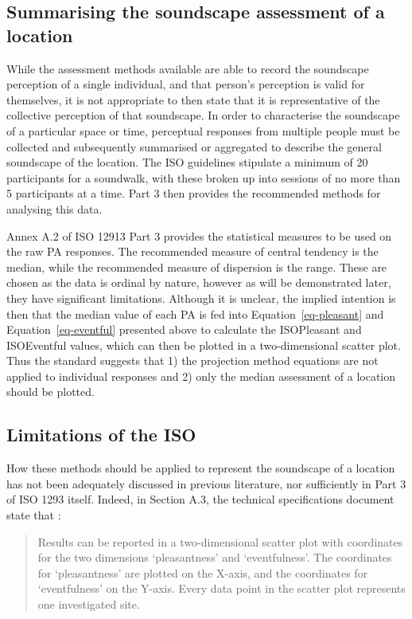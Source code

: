 \documentclass[
  authoryear,
  preprint,
  3p]{elsarticle}
\begin{document}
\subsection{Summarising the soundscape assessment of a
location}\label{summarising-the-soundscape-assessment-of-a-location}

While the assessment methods available are able to record the soundscape
perception of a single individual, and that person's perception is valid
for themselves, it is not appropriate to then state that it is
representative of the collective perception of that soundscape. In order
to characterise the soundscape of a particular space or time, perceptual
responses from multiple people must be collected and subsequently
summarised or aggregated to describe the general soundscape of the
location. The ISO guidelines stipulate a minimum of 20 participants for
a soundwalk, with these broken up into sessions of no more than 5
participants at a time. Part 3 then provides the recommended methods for
analysing this data.

Annex A.2 of ISO 12913 Part 3 provides the statistical measures to be
used on the raw PA responses. The recommended measure of central
tendency is the median, while the recommended measure of dispersion is
the range. These are chosen as the data is ordinal by nature, however as
will be demonstrated later, they have significant limitations. Although
it is unclear, the implied intention is then that the median value of
each PA is fed into Equation~\ref{eq-pleasant} and
Equation~\ref{eq-eventful} presented above to calculate the ISOPleasant
and ISOEventful values, which can then be plotted in a two-dimensional
scatter plot. Thus the standard suggests that 1) the projection method
equations are not applied to individual responses and 2) only the median
assessment of a location should be plotted.

\subsection{Limitations of the ISO}\label{limitations-of-the-iso}

How these methods should be applied to represent the soundscape of a
location has not been adequately discussed in previous literature, nor
sufficiently in Part 3 of ISO 1293 itself. Indeed, in Section A.3, the
technical specifications document state that \citep[5]{ISO12913_3}:

\begin{quote}
Results can be reported in a two-dimensional scatter plot with
coordinates for the two dimensions `pleasantness' and `eventfulness'.
The coordinates for `pleasantness' are plotted on the X-axis, and the
coordinates for `eventfulness' on the Y-axis. Every data point in the
scatter plot represents one investigated site.
\end{quote}
\end{document}

